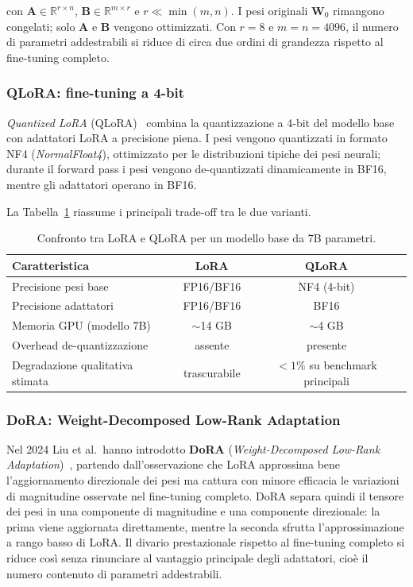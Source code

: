 con $\mathbf{A} \in \mathbb{R}^{r \times n}$, $\mathbf{B} \in \mathbb{R}^{m
\times r}$ e $r \ll \min(m,n)$. I pesi originali $\mathbf{W}_0$ rimangono
congelati; solo $\mathbf{A}$ e $\mathbf{B}$ vengono ottimizzati. Con $r = 8$
e $m = n = 4096$, il numero di parametri addestrabili si riduce di circa due
ordini di grandezza rispetto al fine-tuning completo.

\subsubsection{QLoRA: fine-tuning a 4-bit}

\textit{Quantized LoRA} (QLoRA)~\cite{dettmers2023qlora} combina la
quantizzazione a 4-bit del modello base con adattatori LoRA a precisione piena.
I pesi vengono quantizzati in formato NF4 (\textit{NormalFloat4}), ottimizzato
per le distribuzioni tipiche dei pesi neurali; durante il forward pass i pesi
vengono de-quantizzati dinamicamente in BF16, mentre gli adattatori operano in BF16.

La Tabella~\ref{tab:lora_vs_qlora} riassume i principali trade-off tra le due
varianti.

\begin{table}[ht]
  \centering
  \caption{Confronto tra LoRA e QLoRA per un modello base da 7B parametri.}
  \label{tab:lora_vs_qlora}
  \small
  \begin{tabular}{lcc}
    \toprule
    \textbf{Caratteristica} & \textbf{LoRA} & \textbf{QLoRA} \\
    \midrule
    Precisione pesi base             & FP16/BF16   & NF4 (4-bit) \\
    Precisione adattatori            & FP16/BF16   & BF16        \\
    Memoria GPU (modello 7B)         & $\sim$14 GB & $\sim$4 GB  \\
    Overhead de-quantizzazione       & assente     & presente    \\
    Degradazione qualitativa stimata & trascurabile & ${<}1\%$ su benchmark principali \\
    \bottomrule
  \end{tabular}
\end{table}

\subsubsection{DoRA: Weight-Decomposed Low-Rank Adaptation}

Nel 2024 Liu et al.\ hanno introdotto \textbf{DoRA}
(\textit{Weight-Decomposed Low-Rank Adaptation})~\cite{liu2024dora}, partendo
dall'osservazione che LoRA approssima bene l'aggiornamento direzionale dei pesi
ma cattura con minore efficacia le variazioni di magnitudine osservate nel
fine-tuning completo. DoRA separa quindi il tensore dei pesi in una componente
di magnitudine e una componente direzionale: la prima viene aggiornata
direttamente, mentre la seconda sfrutta l'approssimazione a rango basso di LoRA.
Il divario prestazionale rispetto al fine-tuning completo si riduce così senza
rinunciare al vantaggio principale degli adattatori, cioè il numero contenuto di
parametri addestrabili.

